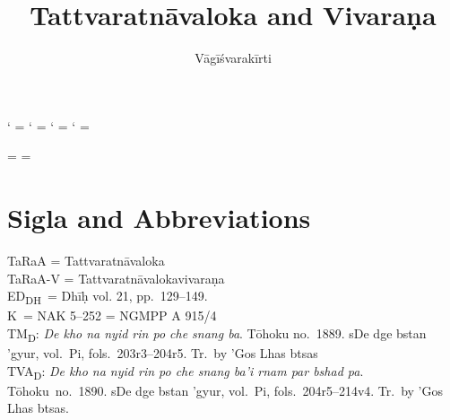 \documentclass[12pt]{article}
\title{Tattvaratnāvaloka and Vivaraṇa}
\author{Vāgīśvarakīrti}
\begin{document}
\maketitle

\makeatletter
\newXeTeXintercharclass\noextraclass
\XeTeXcharclass `\? = \noextraclass
\XeTeXcharclass `\! = \noextraclass
\XeTeXcharclass `\; = \noextraclass
\XeTeXcharclass `\: = \noextraclass

 \noextraclass = {\nobreak}
\XeTeXinterchartoks {} = {\nobreak}
\makeatother

\newcommand{\PCreading}{$^{pc}$}
\newcommand{\ACreading}{$^{ac}$}
\newcommand{\MS}{K}
\newcommand{\EDD}{ED\textsubscript{DH}}
\newcommand{\TM}{TM\textsubscript{D}}
\newcommand{\TVA}{TVA\textsubscript{D}}
\newcommand{\TVB}{TVB\textsubscript{N}}
\newcommand{\TIB}{TIB}
\newcommand{\sigmareading}[1]{$\Sigma$\textsubscript{#1}}

\newcommand{\emd} {\emph{em.}}
\newcommand{\conj} {\emph{conj.}}
\newcommand{\possibleconj} {\emph{possible conj.}}
\newcommand{\corr} {\emph{corr.}}
\newcommand{\diag} {\emph{diag.\ conj.}}
\newcommand{\possibleemd} {\emph{possible em.}}
\newcommand{\possibleconj} {\emph{possible conj.}}

\section{Sigla and Abbreviations}
\noindent TaRaA = Tattvaratnāvaloka\\

\noindent TaRaA-V = Tattvaratnāvalokavivaraṇa\\

\noindent \EDD\ = Dhīḥ vol. 21, pp.\ 129–149.\\

\noindent \MS\ = NAK 5–252 = NGMPP A 915/4\\

\noindent \TM : \emph{De kho na nyid rin po che snang ba}. Tōhoku no.\ 1889. sDe dge bstan 'gyur, vol.\ Pi, fols.\ 203r3–204r5. Tr.\ by 'Gos Lhas btsas\\

\noindent \TVA : \emph{De kho na nyid rin po che snang ba'i rnam par bshad pa}.  Tōhoku\ no.\ 1890.  sDe dge bstan 'gyur, vol.\ Pi, fols.\ 204r5–214v4. Tr.\ by 'Gos Lhas btsas.\\
\end{document}
